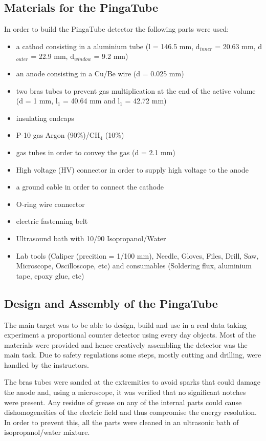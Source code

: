 \subsection{Materials for the PingaTube}
\label{sec:materials_pingatube}
In order to build the PingaTube detector the following parts were used:
\begin{itemize}
\item a cathod consisting in a aluminium tube (l = 146.5 mm, d$_{inner}$ = 20.63
  mm, d$_{outer}$ = 22.9 mm, d$_{window}$ = 9.2 mm)
\item an anode consisting in a Cu/Be wire (d = 0.025 mm)
\item two bras tubes to prevent gas multiplication at the end of the active
  volume (d = 1 mm, l$_{1}$ = 40.64 mm and l$_{1}$ = 42.72 mm)
\item insulating endcaps
\item P-10 gas Argon (90\%)/CH$_{4}$ (10\%)
\item gas tubes in order to convey the gas (d = 2.1 mm)
\item High voltage (HV) connector in order to supply high voltage to the anode
\item a ground cable in order to connect the cathode
\item O-ring wire connector
\item electric fastenning belt
\item Ultrasound bath with 10/90 Isopropanol/Water
\item Lab tools (Caliper (precition = 1/100 mm), Needle, Gloves, Files, Drill,
  Saw, Microscope, Oscilloscope, etc) and consumables (Soldering flux, aluminium
  tape, epoxy glue, etc)
\end{itemize}

\subsection{Design and Assembly of the PingaTube}
\label{sec:design_and_assembly_beercan}
The main target was to be able to design, build and use in a real data taking
experiment a proportional counter detector using every day objects. Most of the
materials were provided and hence creatively assembling the detector was the
main task. Due to safety regulations some steps, mostly cutting and drilling,
were handled by the instructors.

The bras tubes were sanded at the extremities to avoid sparks that could damage
the anode and, using a microscope, it was verified that no significant notches
were present. Any residue of grease on any of the internal parts could cause
dishomogeneities of the electric field and thus compromise the energy
resolution. In order to prevent this, all the parts were cleaned in an
ultrasonic bath of isopropanol/water mixture.

